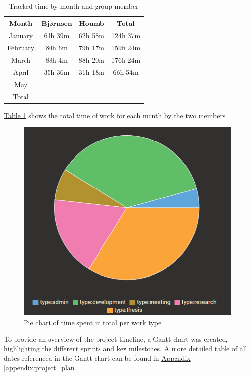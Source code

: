 \begin{table}[h]
    \centering
    \begin{tabular}{c|c|c|c}
        \hline
        \textbf{Month} & \textbf{Bjørnsen} & \textbf{Houmb} & \textbf{Total} \\
        \hline
        January  & 61h 39m  & 62h 58m  & 124h 37m \\
        February & 80h 6m   & 79h 17m  & 159h 24m \\
        March    & 88h 4m   & 88h 20m  & 176h 24m \\
        April    & 35h 36m  & 31h 18m  & 66h 54m \\
        May      &        &        &        \\
        \hline
        Total & & & \\
        \hline
    \end{tabular}
    \caption{Tracked time by month and group member}
    \label{tab:tracked_time_by_month_member}
\end{table}

\hyperref[tab:tracked_time_by_month_member]{Table \ref*{tab:tracked_time_by_month_member}} shows the total time of work for each month by the two members.

\begin{figure}[h]
    \centering
    \includegraphics[width=0.5\linewidth]{figures/time_tracking_by_type.pdf}
    \caption{Pie chart of time spent in total per work type}
    \label{fig:time_tracking_by_type}
\end{figure}


To provide an overview of the project timeline, a Gantt chart was created, highlighting the different sprints and key milestones. A more detailed table of all dates referenced in the Gantt chart can be found in \hyperref[appendix:project_plan]{Appendix \ref*{appendix:project_plan}}.

